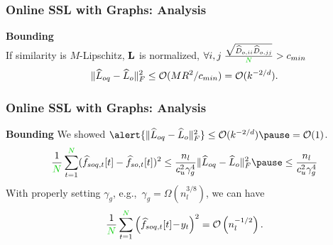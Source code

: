 \documentclass{beamer}
\newcommand{\Lo}{\hat{L}_o}              %
\newcommand{\Loq}{\hat{L}_{oq}}          %
\begin{document}
\begin{frame}
\frametitle{Online SSL with Graphs: Analysis}
\textbf{Bounding } 
\\ \smallskip
If similarity is $M$-Lipschitz\pause, 
$\mathbf{L}$ is normalized\pause, 
$\forall i,j \; \frac{\sqrt{\hat{D}_{o,ii}\hat{D}_{o,jj}}}{\nodes}> c_{min}$
\pause
\begin{align*}
\|\Loq - \Lo\|_F^2
\leq \cO(M R^2/c_{min}) = \cO(k^{-2/d}).
\end{align*}
\pause
{}
\end{frame}

\begin{frame}
\frametitle{Online SSL with Graphs: Analysis}
\textbf{Bounding } 
\moveb
We showed $\alert{\|\Loq - \Lo\|_F^2} \leq \cO(k^{-2/d})
\pause = \cO(1)$.
\pause
\begin{equation*}%
 \frac{1}{\nodes}\sum_{t=1}^\nodes (\hat{f}_{soq,t}[t] - \hat{f}_{so,t}[t])^2
 \leq
 \frac{n_l}{c_u^2\gamma_g^4}
\|\Loq - \Lo\|_F^2 \pause \leq \frac{n_l}{c_u^2\gamma_g^4}
 \end{equation*}
\pause
With properly setting $\gamma_g$, e.g.,~$\gamma_g = \Omega(n_l^{3/8})$, we can have
\pause
$$\frac{1}{\nodes} \sum_{t=1}^\nodes \left(\hat{f}_{soq,t}[t] \!-\! y_t\right)^2 = \cO\left(n_l^{-1/2}\right).$$
\pause
{}
\end{frame}


\MakeLastSlide
\end{document}
